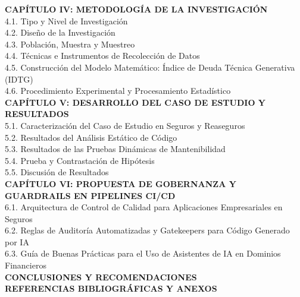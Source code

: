 {\noindent\textbf{CAPÍTULO IV: METODOLOGÍA DE LA INVESTIGACIÓN}\\
4.1. Tipo y Nivel de Investigación\\
4.2. Diseño de la Investigación\\
4.3. Población, Muestra y Muestreo\\
4.4. Técnicas e Instrumentos de Recolección de Datos\\
4.5. Construcción del Modelo Matemático: Índice de Deuda Técnica Generativa (IDTG)\\
4.6. Procedimiento Experimental y Procesamiento Estadístico\\[6pt]

\noindent\textbf{CAPÍTULO V: DESARROLLO DEL CASO DE ESTUDIO Y RESULTADOS}\\
5.1. Caracterización del Caso de Estudio en Seguros y Reaseguros\\
5.2. Resultados del Análisis Estático de Código\\
5.3. Resultados de las Pruebas Dinámicas de Mantenibilidad\\
5.4. Prueba y Contrastación de Hipótesis\\
5.5. Discusión de Resultados\\[6pt]

\noindent\textbf{CAPÍTULO VI: PROPUESTA DE GOBERNANZA Y GUARDRAILS EN PIPELINES CI/CD}\\
6.1. Arquitectura de Control de Calidad para Aplicaciones Empresariales en Seguros\\
6.2. Reglas de Auditoría Automatizadas y Gatekeepers para Código Generado por IA\\
6.3. Guía de Buenas Prácticas para el Uso de Asistentes de IA en Dominios Financieros\\[6pt]

\noindent\textbf{CONCLUSIONES Y RECOMENDACIONES}\\
\noindent\textbf{REFERENCIAS BIBLIOGRÁFICAS Y ANEXOS}
\par}
